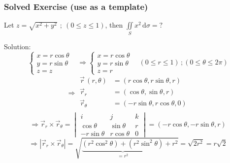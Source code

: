 \documentclass[12pt, fleqn]{book}
\newcommand{\D}{\mathrm{d}}
\begin{document}
	 		\subsubsection{Solved Exercise (use as a template)}
	 			Let $z = \sqrt{x^2 + y^2} \ \, ; \ (0 \le z \le 1)$, then $\iint\limits_S x^2 \, \D \sigma = ?$
	 			
	 			Solution:
	 			\begin{equation*}
	 				\begin{cases}
	 					x = r\cos\theta & \\
	 					y = r\sin\theta & \\
	 					z = z
	 				\end{cases}
 				    \Rightarrow
 				    \begin{cases}
	 					x = r\cos\theta & \\
						y = r\sin\theta & \\
						z= r
 				    \end{cases}
 			    	\, (0 \le r \le 1) \, ; (0 \le \theta \le 2\pi) 			    	
	 			\end{equation*}
 				\begin{equation*}
 					\Rightarrow
 					\begin{split}
 						\vec{r}\,(r, \theta) 
 						               & = (r\cos\theta, r\sin\theta, r) \\
 						\vec{r}_r      & = (\cos\theta, \sin\theta, r) \\
 						\vec{r}_\theta & = (-r\sin\theta, r\cos\theta, 0) \\
 					\end{split}
 				\end{equation*}
 				\begin{equation*}
 					\Rightarrow
 					\vec{r}_r \times \vec{r}_\theta = 
 					\begin{vmatrix}
 						i            & j             & k \\
 						\cos\theta   & \sin\theta    & r \\
 						-r\sin\theta & r\cos\theta & 0
 					\end{vmatrix} = (-r\cos\theta, -r\sin\theta, r)
 				\end{equation*}
 				\begin{equation*}
 					\Rightarrow
					\left|\vec{r}_r \times \vec{r}_\theta\right|
         			 = \sqrt{
         			 	\underbrace{
             			 	(r^2\cos^2\theta) +
            			 	(r^2\sin^2\theta)
         		 	    }_{=r^2}
         	 	        + r^2
					 }
					 = \sqrt{2r^2}
					 = r\sqrt{2} 				
 				\end{equation*}
\end{document}
